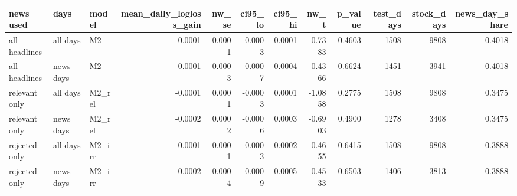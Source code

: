 \begin{tabular}{lllrrrrrrrrr}
\toprule
news used & days & model & mean\_daily\_logloss\_gain & nw\_se & ci95\_lo & ci95\_hi & nw\_t & p\_value & test\_days & stock\_days & news\_day\_share \\
\midrule
all headlines & all days & M2 & -0.0001 & 0.0001 & -0.0003 & 0.0001 & -0.7383 & 0.4603 & 1508 & 9808 & 0.4018 \\
all headlines & news days & M2 & -0.0001 & 0.0003 & -0.0007 & 0.0004 & -0.4366 & 0.6624 & 1451 & 3941 & 0.4018 \\
relevant only & all days & M2\_rel & -0.0001 & 0.0001 & -0.0003 & 0.0001 & -1.0858 & 0.2775 & 1508 & 9808 & 0.3475 \\
relevant only & news days & M2\_rel & -0.0002 & 0.0002 & -0.0006 & 0.0003 & -0.6903 & 0.4900 & 1278 & 3408 & 0.3475 \\
rejected only & all days & M2\_irr & -0.0001 & 0.0001 & -0.0003 & 0.0002 & -0.4655 & 0.6415 & 1508 & 9808 & 0.3888 \\
rejected only & news days & M2\_irr & -0.0002 & 0.0004 & -0.0009 & 0.0005 & -0.4533 & 0.6503 & 1406 & 3813 & 0.3888 \\
\bottomrule
\end{tabular}
